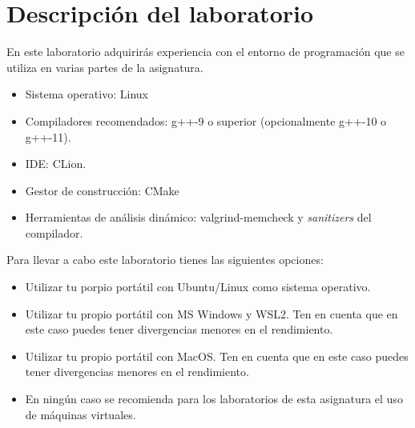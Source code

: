 \section{Descripción del laboratorio}

En este laboratorio adquirirás experiencia con el entorno de programación que se utiliza en varias partes
de la asignatura.

\begin{itemize}
  \item Sistema operativo: Linux
  \item Compiladores recomendados: g++-9 o superior (opcionalmente g++-10 o g++-11).
  \item IDE: CLion.
  \item Gestor de construcción: CMake
  \item Herramientas de análisis dinámico: valgrind-memcheck y \emph{sanitizers} del compilador.
\end{itemize}

Para llevar a cabo este laboratorio tienes las siguientes opciones:
\begin{itemize}
  \item Utilizar tu porpio portátil con Ubuntu/Linux como sistema operativo.
  \item Utilizar tu propio portátil con MS Windows y WSL2. 
        Ten en cuenta que en este caso puedes tener divergencias menores en el rendimiento.
  \item Utilizar tu propio portátil con MacOS.
        Ten en cuenta que en este caso puedes tener divergencias menores en el rendimiento.
  \item En ningún caso se recomienda para los laboratorios de esta asignatura el uso de máquinas virtuales.
\end{itemize}
